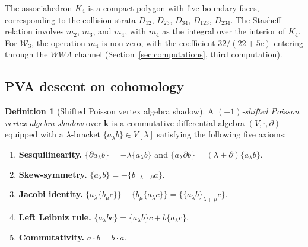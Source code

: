 \documentclass[11pt,reqno]{amsart}
\theoremstyle{definition}
\newtheorem{definition}[theorem]{Definition}
\theoremstyle{remark}
\newcommand{\cW}{\mathcal{W}}
\providecommand{\Bbbk}{\mathbf{k}}
\numberwithin{equation}{section}
\begin{document}
The associahedron $K_4$ is a compact polygon with five boundary
faces, corresponding to the collision strata
$D_{12}$, $D_{23}$, $D_{34}$, $D_{123}$, $D_{234}$.  The
Stasheff relation involves $m_2$, $m_3$, and $m_4$, with $m_4$
as the integral over the interior of $K_4$.  For $\cW_3$, the
operation $m_4$ is non-zero, with the coefficient $32/(22+5c)$
entering through the $WW\Lambda$ channel
(Section~\ref{sec:computations}, third computation).


\subsection{PVA descent on cohomology}

\begin{definition}[Shifted Poisson vertex algebra shadow]
\label{def:PVA}
A \emph{$(-1)$-shifted Poisson vertex algebra shadow} over $\Bbbk$ is a
commutative differential algebra $(V, \cdot, \partial)$ equipped
with a $\lambda$-bracket
$\{a_\lambda b\} \in V[\lambda]$
satisfying the following five axioms:
\begin{enumerate}[label=(PVA\arabic*)]
\item \textbf{Sesquilinearity.}
  $\{\partial a_\lambda b\} = -\lambda\{a_\lambda b\}$
  and
  $\{a_\lambda \partial b\} = (\lambda + \partial)\{a_\lambda b\}$.

\item \textbf{Skew-symmetry.}
  $\{a_\lambda b\} = -\{b_{-\lambda-\partial} a\}$.

\item \textbf{Jacobi identity.}
  $\{a_\lambda \{b_\mu c\}\}
  - \{b_\mu \{a_\lambda c\}\}
  = \{\{a_\lambda b\}_{\lambda+\mu} c\}$.

\item \textbf{Left Leibniz rule.}
  $\{a_\lambda bc\}
  = \{a_\lambda b\}c + b\{a_\lambda c\}$.

\item \textbf{Commutativity.}
  $a \cdot b = b \cdot a$.
\end{enumerate}
\end{definition}
\end{document}
